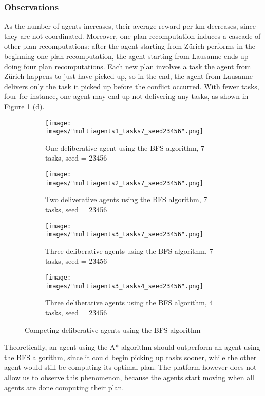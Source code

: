 \documentclass[10pt]{article}
\begin{document}
\subsubsection{Observations}
As the number of agents increases, their average reward per km decreases, since they are not coordinated.
Moreover, one plan recomputation induces a cascade of other plan recomputations: after the agent starting from Z\"urich performs in the beginning one plan recomputation, the agent starting from Lausanne ends up doing four plan recomputations. Each new plan involves a task the agent from Z\"urich happens to just have picked up, so in the end, the agent from Lausanne delivers only the task it picked up before the conflict occurred.
With fewer tasks, four for instance, one agent may end up not delivering any tasks, as shown in Figure 1 (d).


\begin{figure}[h!]
\centering
\begin{subfigure}[t]{0.24\textwidth}
\captionsetup{width=1.0\textwidth}
\texttt{[image: images/"multiagents1\_tasks7\_seed23456".png]}
\caption{One deliberative agent using the BFS algorithm, 7 tasks, seed = 23456}
\end{subfigure}
\hfill
\begin{subfigure}[t]{0.24\textwidth}
\captionsetup{width=1.0\textwidth}
\texttt{[image: images/"multiagents2\_tasks7\_seed23456".png]}
\caption{Two deliverative agents using the BFS algorithm, 7 tasks, seed = 23456}
\end{subfigure}
\hfill
\begin{subfigure}[t]{0.24\textwidth}
\captionsetup{width=1.0\textwidth}
\texttt{[image: images/"multiagents3\_tasks7\_seed23456".png]}
\caption{Three deliberative agents using the BFS algorithm, 7 tasks, seed = 23456}
\end{subfigure}
\hfill
\begin{subfigure}[t]{0.24\textwidth}
\captionsetup{width=1.0\textwidth}
\texttt{[image: images/"multiagents3\_tasks4\_seed23456".png]}
\caption{Three deliberative agents using the BFS algorithm, 4 tasks, seed = 23456}
\end{subfigure}
\caption{Competing deliberative agents using the BFS algorithm}
\label{discount factor}
\end{figure}

\noindent
Theoretically, an agent using the A* algorithm should outperform an agent using the BFS algorithm, since it could begin picking up tasks sooner, while the other agent would still be computing its optimal plan.
The platform however does not allow us to observe this phenomenon, because the agents start moving when all agents are done computing their plan.
\end{document}

